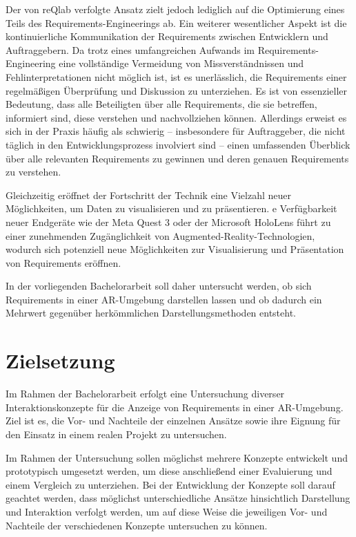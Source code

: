 Der von reQlab verfolgte Ansatz zielt jedoch lediglich auf die Optimierung eines Teils des Requirements-Engineerings ab.
Ein weiterer wesentlicher Aspekt ist die kontinuierliche Kommunikation der Requirements zwischen Entwicklern und Auftraggebern.
Da trotz eines umfangreichen Aufwands im Requirements-Engineering eine vollständige Vermeidung von Missverständnissen und Fehlinterpretationen nicht möglich ist, ist es unerlässlich, die Requirements einer regelmäßigen Überprüfung und Diskussion zu unterziehen.
Es ist von essenzieller Bedeutung, dass alle Beteiligten über alle Requirements, die sie betreffen, informiert sind, diese verstehen und nachvollziehen können.
Allerdings erweist es sich in der Praxis häufig als schwierig -- insbesondere für Auftraggeber, die nicht täglich in den Entwicklungsprozess involviert sind -- einen umfassenden Überblick über alle relevanten Requirements zu gewinnen und deren genauen Requirements zu verstehen.

Gleichzeitig eröffnet der Fortschritt der Technik eine Vielzahl neuer Möglichkeiten, um Daten zu visualisieren und zu präsentieren.
e Verfügbarkeit neuer Endgeräte wie der Meta Quest 3 oder der Microsoft HoloLens führt zu einer zunehmenden Zugänglichkeit von Augmented-Reality-Technologien, wodurch sich potenziell neue Möglichkeiten zur Visualisierung und Präsentation von Requirements eröffnen.

In der vorliegenden Bachelorarbeit soll daher untersucht werden, ob sich Requirements in einer AR-Umgebung darstellen lassen und ob dadurch ein Mehrwert gegenüber herkömmlichen Darstellungsmethoden entsteht.



\section{Zielsetzung}

Im Rahmen der Bachelorarbeit erfolgt eine Untersuchung diverser Interaktionskonzepte für die Anzeige von Requirements in einer AR-Umgebung.
Ziel ist es, die Vor- und Nachteile der einzelnen Ansätze sowie ihre Eignung für den Einsatz in einem realen Projekt zu untersuchen.

Im Rahmen der Untersuchung sollen möglichst mehrere Konzepte entwickelt und prototypisch umgesetzt werden, um diese anschließend einer Evaluierung und einem Vergleich zu unterziehen.
Bei der Entwicklung der Konzepte soll darauf geachtet werden, dass möglichst unterschiedliche Ansätze hinsichtlich Darstellung und Interaktion verfolgt werden, um auf diese Weise die jeweiligen Vor- und Nachteile der verschiedenen Konzepte untersuchen zu können.

